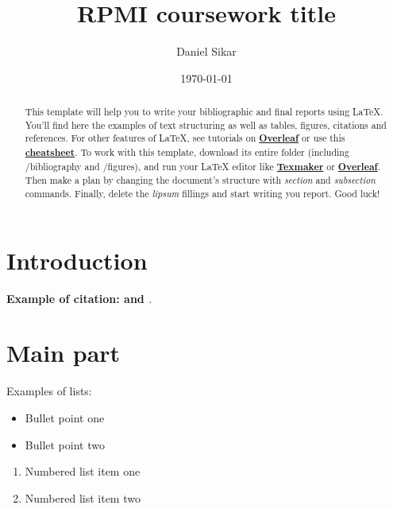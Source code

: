 \documentclass[12pt]{article}
\begin{document}
\title{RPMI coursework title} %
\author{Daniel Sikar}
\date{\today} %
\maketitle %


\begin{abstract}
This template will help you to write your bibliographic and final reports using \LaTeX{}. You'll find here the examples of text structuring as well as tables, figures, citations and references. For other features of \LaTeX, see tutorials on \href{https://www.overleaf.com/learn}{\textbf{Overleaf}} or use this \href{https://wch.github.io/latexsheet/}{\textbf{cheatsheet}}. To work with this template, download its entire folder (including /bibliography and /figures), and run your \LaTeX{}  editor like \href{http://www.xm1math.net/texmaker/}{\textbf{Texmaker}} or \href{https://www.overleaf.com}{\textbf{Overleaf}}. Then make a plan by changing the document's structure with \textit{section} and \textit{subsection} commands. Finally, delete the \textit{lipsum} fillings and start writing you report. Good luck!
\end{abstract}


\section{Introduction}

\textbf{Example of citation: \cite{Smith_2013} and \cite{Smith_2012}}. \lipsum[2]

\section{Main part}
\label{S:1}
\lipsum[9]

Examples of lists:
\begin{itemize}
\item Bullet point one
\item Bullet point two
\end{itemize}

\begin{enumerate}
\item Numbered list item one
\item Numbered list item two
\end{enumerate}
\end{document}
